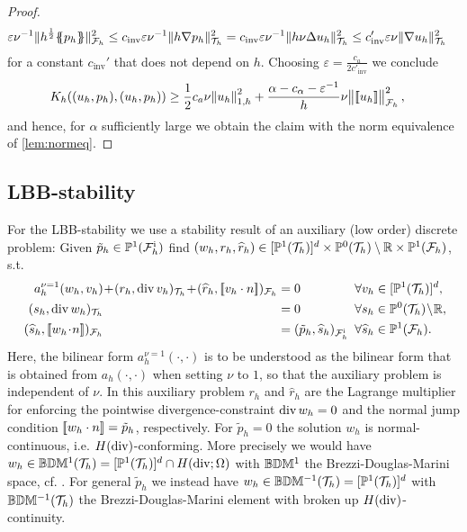 \documentclass[pdflatex,sn-mathphys,Numbered]{sn-jnl}%
\renewcommand{\hat}[1]{\widehat{#1}}
\theoremstyle{remark}%
\theoremstyle{definition}%
\begin{document}
\begin{proof}
\begin{align*}
    \varepsilon \nu^{-1} \Vert h^{\frac12} \{\!\!\{ p_h\}\!\!\} \Vert_{{\mathcal{F}_h}}^2  &\leq c_{\text{inv}} \varepsilon \nu^{-1} \Vert  h \nabla p_h \Vert_{{\mathcal{T}_h}}^2 = c_{\text{inv}} \varepsilon \nu^{-1}  \Vert  h \nu \Delta u_h \Vert_{{\mathcal{T}_h}}^2 \leq c_{\text{inv}}' \varepsilon \nu \Vert \nabla u_h \Vert_{{\mathcal{T}_h}}^2
  \end{align*} 
  for a constant $c_{\text{inv}}'$ that does not depend on $h$. Choosing $\varepsilon = \frac{c_a}{2 c'_{\text{inv}}}$ we conclude
  \begin{align*}
    K_h((u_h,p_h),(u_h,p_h)) & \geq \frac12 c_a \nu  \norm{u_h}_{1,h}^2 + \frac{\alpha - c_\alpha - \varepsilon^{-1}}{h} \nu \norm{[\![u_h]\!]}_{{\mathcal{F}_h}}^2,
  \end{align*}
  and hence, for $\alpha$ sufficiently large we obtain the claim with the norm equivalence of \cref{lem:normeq}.
\end{proof}

\subsection{LBB-stability}
For the LBB-stability we use a stability result of an auxiliary (low order) discrete problem: Given $\tilde{p}_h \in \mathbb{P}^1({\mathcal{F}_h^{\text{i}}})$ find $(w_h,r_h,\hat{r}_h) \in [\PP^{1}(\Th)]^d \times \PP^0(\Th) \setminus \RR \times \PP^1(\Fh) $, s.t.
\begin{subequations}\label{eq:aux}
\begin{align}
  a_{h}^{\nu = 1}(w_h,v_h) & \!+\! (r_h, \Div v_h)_{\Th} \!+\! (\hat{r}_h, \jmp{v_h \cdot n})_{\Fh}  &&
  \!\!\!\!\!\!= 0 &&\!\!\! \forall v_h \in [\PP^1(\Th)]^d, \label{eq:auxa}\\
  (s_h, \Div w_h)_{\Th} &&& \!\!\!\!\!\!= 0 &&\!\!\! \forall s_h \in \PP^0(\Th) \! \setminus \! \RR,\!\! \label{eq:auxb}\\
  (\hat{s}_h, \jmp{w_h \!\cdot\! n})_{\Fh} 
  &&& \!\!\!\!\!\! = (\tilde{p}_h, \hat{s}_h)_{\Fhi}   &&\!\!\! \forall \hat{s}_h \in  \PP^1(\Fh). \label{eq:auxc}
\end{align}
\end{subequations}
Here, the bilinear form $a_{h}^{\nu = 1}(\cdot,\cdot)$ is to be understood as the bilinear form that is obtained from $a_{h}(\cdot,\cdot)$ when setting $\nu$ to $1$, so that the auxiliary problem is independent of $\nu$. In this auxiliary problem $r_h$ and $\hat{r}_h$ are the Lagrange multiplier for enforcing the pointwise divergence-constraint $\operatorname{\mathrm{div}} w_h=0$ and the normal jump condition $[\![w_h \cdot n]\!] = \tilde{p}_h$, respectively.
For $\tilde{p}_h = 0$ the solution $w_h$ is normal-continuous, i.e. $H(\operatorname{\mathrm{div}})$-conforming. More precisely we would have $w_h \in \mathbb{B}\mathbb{D}\mathbb{M}^{1}({\mathcal{T}_h}) = [\mathbb{P}^1({\mathcal{T}_h})]^d \cap H(\operatorname{\mathrm{div}};\Omega)$ with $\mathbb{B}\mathbb{D}\mathbb{M}^{1}$ the Brezzi-Douglas-Marini space, cf. \cite{brezzi}. For general $\tilde{p}_h$ we instead have 
$w_h \in \mathbb{B}\mathbb{D}\mathbb{M}^{-1}({\mathcal{T}_h}) = [\mathbb{P}^1({\mathcal{T}_h})]^d$ with $\mathbb{B}\mathbb{D}\mathbb{M}^{-1}({\mathcal{T}_h})$ the Brezzi-Douglas-Marini element with broken up $H(\operatorname{\mathrm{div}})$-continuity.
\end{document}
